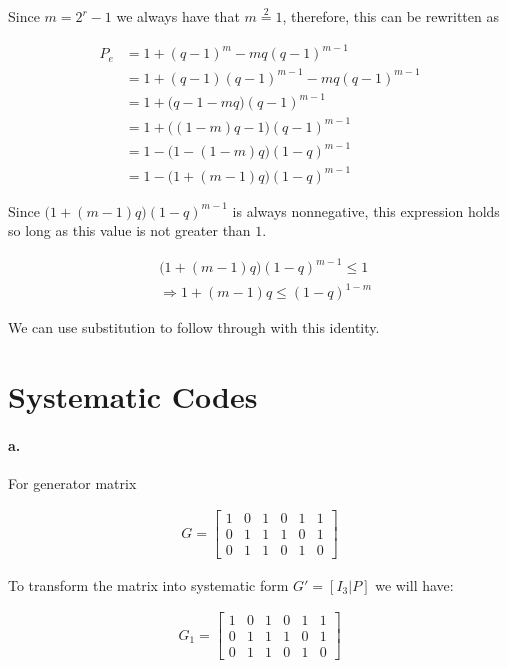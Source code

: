 \documentclass{article}
\begin{document}
Since $m=2^r-1$ we always have that $m\stackrel{2}{=}1$, therefore, this can be
rewritten as

\begin{align*}
  P_e&=1+(q-1)^m-mq(q-1)^{m-1} \\
     &=1+(q-1)(q-1)^{m-1}-mq(q-1)^{m-1}\\
     &=1+\Big(q-1-mq\Big)(q-1)^{m-1}\\
     &=1+\Big((1-m)q-1\Big)(q-1)^{m-1}\\
     &=1-\Big(1-(1-m)q\Big)(1-q)^{m-1}\\
     &=1-\Big(1+(m-1)q\Big)(1-q)^{m-1}
\end{align*}

Since $\Big(1+(m-1)q\Big)(1-q)^{m-1}$ is always nonnegative, this expression holds
so long as this value is not greater than $1$.

\begin{align*}
  & \Big(1+(m-1)q\Big)(1-q)^{m-1} \leq 1 \\
  & \Rightarrow 1+(m-1)q \leq (1-q)^{1-m}
\end{align*}

We can use substitution to follow through with this identity.

\section{Systematic Codes}

\paragraph{a.} For generator matrix

\begin{align*}
  G=\begin{bmatrix}
    1 & 0 & 1 & 0 & 1 & 1 \\
    0 & 1 & 1 & 1 & 0 & 1 \\
    0 & 1 & 1 & 0 & 1 & 0
  \end{bmatrix}
\end{align*}

To transform the matrix into systematic form $G'=[I_3|P]$ we will have:

\begin{align*}
  G_1=\begin{bmatrix}
    1 & 0 & 1 & 0 & 1 & 1 \\
    0 & 1 & 1 & 1 & 0 & 1 \\
    0 & 1 & 1 & 0 & 1 & 0
  \end{bmatrix}
\end{align*}
\end{document}
